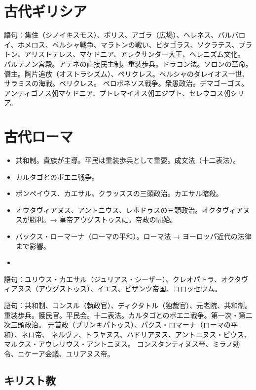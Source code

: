 \documentclass[autodetect-engine,dvipdfmx-if-dvi,ja=standard]{jsarticle} \usepackage{mystyle}
\begin{document}
\section{古代ギリシア}

語句：集住（シノイキスモス）、ポリス、アゴラ（広場）、ヘレネス、バルバロイ、ホメロス、ペルシャ戦争、マラトンの戦い、ピタゴラス、ソクラテス、プラトン、アリストテレス、マケドニア、アレクサンダー大王、ヘレニズム文化。
パルテノン宮殿。アテネの直接民主制。重装歩兵。ドラコン法。ソロンの革命。僭主。陶片追放（オストラシズム）、ペリクレス。ペルシャのダレイオス一世、サラミスの海戦。ペリクレス。
ペロポネソス戦争。衆愚政治。デマゴーゴス。
アンティゴノス朝マケドニア、プトレマイオス朝エジプト、セレウコス朝シリア。



\section{古代ローマ}


\begin{itemize}
\item 共和制。貴族が主導。平民は重装歩兵として重要。成文法（十二表法）。
\item カルタゴとのポエニ戦争。
\item ポンペイウス、カエサル、クラッススの三頭政治。カエサル暗殺。
\item オウタヴィアヌス、アントニウス、レポドゥスの三頭政治。オクタヴィアヌスが勝利。→ 皇帝アウグストゥスに。帝政の開始。
  
\item パックス・ローマーナ（ローマの平和）。ローマ法 → ヨーロッパ近代の法律まで影響。
\item 
\end{itemize}

語句：ユリウス・カエサル（ジュリアス・シーザー）、クレオパトラ、オクタヴィアヌス（アウグストゥス）、イエス、ビザンツ帝国、コロッセウム。

語句：共和制、コンスル（執政官）、ディクタトル（独裁官）、元老院、共和制。
重装歩兵。護民官。平民会。十二表法。カルタゴとのポエニ戦争。第一次・第二次三頭政治。
元首政（プリンキパトゥス）、パクス・ロマーナ（ローマの平和）、ネロ帝、
ネルヴァ、トラヤヌス、ハドリアヌス、アントニヌス・ピウス、マルクス・アウレリウス・アントニヌス。
コンスタンティヌス帝、ミラノ勅令、ニケーア会議、ユリアヌス帝。


\subsection{キリスト教}
\end{document}
